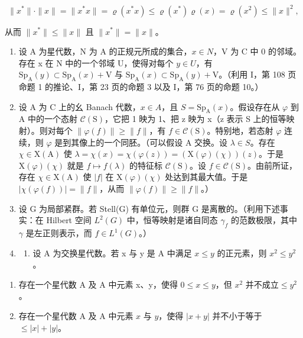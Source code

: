 \[
\| x ^ {*} \| \cdot \| x \| = \| x ^ {*} x \| = \varrho (x ^ {*} x) \leqslant \varrho (x ^ {*}) \varrho (x) = \varrho (x ^ {2}) \leqslant \| x \| ^ {2},
\]

从而 \(\|x^{*}\|\leqslant\|x\|\) 且 \(\|x^{*}\|=\|x\|\)。

\begin{enumerate}
\def\labelenumi{\arabic{enumi})}
\setcounter{enumi}{11}
\item
  设 A 为星代数，N 为 A 的正规元所成的集合，\(x \in N\)，V 为 C 中 0 的邻域。存在 x 在 N 中的一个邻域 U，使得对每个 \(y \in U\)，有 \(\mathrm{Sp}_{\mathrm{A}}(y) \subset \mathrm{Sp}_{\mathrm{A}}(x) + \mathrm{V}\) 与 \(\mathrm{Sp}_{\mathrm{A}}(x) \subset \mathrm{Sp}_{\mathrm{A}}(y) + \mathrm{V}\)。（利用 I，第 108 页命题 1 的推论、I，第 23 页的命题 3 以及 I，第 76 页的命题 10。）
\item
  设 A 为 C 上的幺 Banach 代数，\(x \in A\)，且 \(S = \mathrm{Sp}_{\mathrm{A}}(x)\)。假设存在从 \(\varphi\) 到 A 中的一个态射 \(\mathcal{C}(\mathrm{S})\)，它把 1 映为 1、把 z 映为 x（z 表示 S 上的恒等映射）。则对每个 \(\|\varphi(f)\| \geqslant \|f\|\)，有 \(f \in \mathcal{C}(\mathrm{S})\)。特别地，若态射 \(\varphi\) 连续，则 \(\varphi\) 是到其像上的一个同胚。（可以假设 A 交换。设 \(\lambda \in S\)。存在 \(\chi \in \mathrm{X}(\mathrm{A})\) 使 \(\lambda = \chi(x) = \chi(\varphi(z)) = (\mathrm{X}(\varphi)(\chi))(z)\)。于是 \(\mathrm{X}(\varphi)(\chi)\) 就是 \(f \mapsto f(\lambda)\) 的特征标 \(\mathcal{C}(\mathrm{S})\)。设 \(f \in \mathcal{C}(\mathrm{S})\)。由前所证，存在 \(\chi \in \mathrm{X}(\mathrm{A})\) 使 \(|f|\) 在 \(\mathrm{X}(\varphi)(\chi)\) 处达到其最大值。于是 \(|\chi(\varphi(f))| = \|f\|\)，从而 \(\|\varphi(f)\| \geqslant \|f\|\)。）
\item
  设 G 为局部紧群。若 Stell(G) 有单位元，则群 G 是离散的。（利用下述事实：在 Hilbert 空间 \(L^{2}(G)\) 中，恒等映射是诸自同态 \(\gamma_{f}\) 的范数极限，其中 \(\gamma\) 是左正则表示，而 \(f \in L^{1}(G)\)。）
\item
  \begin{enumerate}
  \def\labelenumii{\alph{enumii})}
  \tightlist
  \item
    设 A 为交换星代数。若 x 与 y 是 A 中满足 \(x \leqslant y\) 的正元素，则 \(x^{2} \leqslant y^{2}\)。
  \end{enumerate}
\end{enumerate}

\begin{enumerate}
\def\labelenumi{\alph{enumi})}
\setcounter{enumi}{1}
\item
  存在一个星代数 A 及 A 中元素 x、y，使得 \(0 \leqslant x \leqslant y\)，但 \(x^{2}\) 并不成立\(\leqslant y^{2}\)。
\item
  存在一个星代数 A 及 A 中元素 \(x\) 与 \(y\)，使得 \(|x + y|\) 并不小于等于 \(\leqslant |x| + |y|\)。
\end{enumerate}

